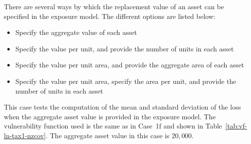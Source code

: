 There are several ways by which the replacement value of an asset can be specified in the exposure model. The different options are listed below:

\begin{itemize}
	\item Specify the aggregate value of each asset
	\item Specify the value per unit, and provide the number of units in each asset
	\item Specify the value per unit area, and provide the aggregate area of each asset
	\item Specify the value per unit area, specify the area per unit, and provide the number of units in each asset
\end{itemize}

This case tests the computation of the mean and standard deviation of the loss when the aggregate asset value is provided in the exposure model. The vulnerability function used is the same as in Case~1f and shown in Table~\ref{tab:vf-ln-tax1-nzcov}. The aggregate asset value in this case is $20,000$.